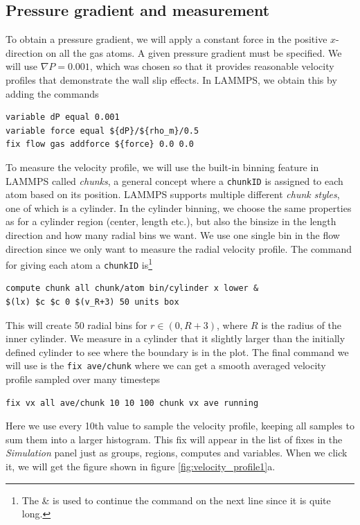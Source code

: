 \documentclass[12pt,a4paper,final]{iopart}
\newcommand{\code}[1]{\colorbox{light-gray}{\color{RawSienna}\texttt{#1}}}
\begin{document}
\subsection{Pressure gradient and measurement}
To obtain a pressure gradient, we will apply a constant force in the positive $x$-direction on all the gas atoms.
A given pressure gradient must be specified. We will use $\nabla P = 0.001$, which was chosen so that it provides reasonable velocity profiles that demonstrate the wall slip effects.
In LAMMPS, we obtain this by adding the commands
%
\begin{lstlisting}
variable dP equal 0.001
variable force equal ${dP}/${rho_m}/0.5
fix flow gas addforce ${force} 0.0 0.0
\end{lstlisting}
%
To measure the velocity profile, we will use the built-in binning feature in LAMMPS called \textit{chunks},
a general concept where a \code{chunkID} is assigned to each atom
based on its position. LAMMPS supports multiple different \textit{chunk styles}, one of which is a cylinder.
In the cylinder binning, we choose the same properties as for a cylinder region (center, length etc.), but also the binsize in the length direction and how many radial bins we want.
We use one single bin in the flow direction since we only want to measure the radial velocity profile.
The command for giving each atom a \code{chunkID} is\footnote{The \& is used to continue the command on the next line since it is quite long.}
\begin{lstlisting}
compute chunk all chunk/atom bin/cylinder x lower &
$(lx) $c $c 0 $(v_R+3) 50 units box
\end{lstlisting}
This will create 50 radial bins for $r\in (0, R+3)$, where $R$ is the radius of the inner cylinder.
We measure in a cylinder that it slightly larger than the initially defined cylinder to see where the boundary is in the plot.
The final command we will use is the \code{fix ave/chunk} where we can get a smooth averaged velocity profile sampled over many timesteps
\begin{lstlisting}
fix vx all ave/chunk 10 10 100 chunk vx ave running
\end{lstlisting}
Here we use every 10th value to sample the velocity profile, keeping all samples to sum them into a larger histogram.
This fix will appear in the list of fixes in the \textit{Simulation} panel just as groups, regions, computes and variables.
When we click it, we will get the figure shown in figure \ref{fig:velocity_profile1}a.
\end{document}
